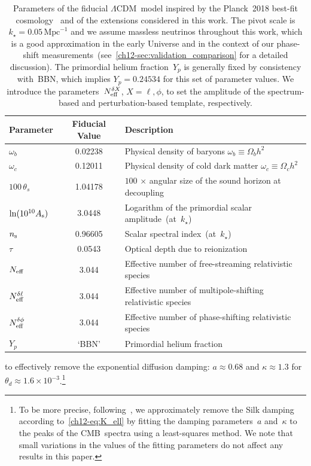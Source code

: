 \begin{table}
	\centering\small

	\begin{tabular}{l c l}
			\toprule
		Parameter 				& {Fiducial Value}		& Description															\\
			\midrule[0.065em]
		$\omega_b$ 				& 0.02238 				& Physical density of baryons $\omega_b \equiv \Omega_b h^2$			\\
		$\omega_c$				& 0.12011				& Physical density of cold dark matter $\omega_c \equiv \Omega_c h^2$	\\
		$100\,\theta_s$ 		& 1.04178 				& $100\,\times\,$angular size of the sound horizon at decoupling 		\\
		$\ln(10^{10}A_\mathrm{s})$		& 3.0448				& Logarithm of the primordial scalar amplitude~(at~$k_\star$)			\\
		$n_\mathrm{s}$					& 0.96605 				& Scalar spectral index~(at~$k_\star$)									\\
		$\tau$ 					& 0.0543 				& Optical depth due to reionization										\\
			\midrule[0.065em]
		$N_\mathrm{eff}$					& 3.044 				& Effective number of free-streaming relativistic species				\\
		$N_\mathrm{eff}^{\delta\ell}$			& 3.044 				& Effective number of multipole-shifting relativistic species\\
		$N_\mathrm{eff}^{\delta\phi}$				& 3.044 				& Effective number of phase-shifting relativistic species	\\
		$Y_p$					& {`BBN'\hskip6.5pt}	& Primordial helium fraction 											\\
			\bottomrule
	\end{tabular}
	\caption[Fiducial cosmological parameters]{Parameters of the fiducial $\Lambda$CDM~model inspired by the Planck~2018 best-fit cosmology~\cite{Planck:2018vyg} and of the extensions considered in this work. The pivot scale is $k_\star = 0.05\,\mathrm{Mpc}^{-1}$ and we assume massless neutrinos throughout this work, which is a good approximation in the early Universe and in the context of our phase-shift measurements~(see~\textsection\ref{ch12-sec:validation_comparison} for a detailed discussion). The primordial helium fraction~$Y_p$ is generally fixed by consistency with~BBN, which implies $Y_p = 0.24534$ for this set of parameter values. We introduce the parameters~$N_\mathrm{eff}^{\delta X}$, $X = \ell, \phi$, to set the amplitude of the spectrum-based and perturbation-based template, respectively.}
	\label{ch12-tab:parameters}
\end{table}
to effectively remove the exponential diffusion damping: $a \approx 0.68$ and $\kappa \approx 1.3$ for $\theta_d \approx 1.6 \times 10^{-3}$.\footnote{To be more precise, following~\cite{Wallisch:2018rzj}, we approximately remove the Silk damping according to~\eqref{ch12-eq:K_ell} by fitting the damping parameters~$a$ and~$\kappa$ to the peaks of the CMB~spectra using a least-squares method. We note that small variations in the values of the fitting parameters do not affect any results in this paper.}\medskip

